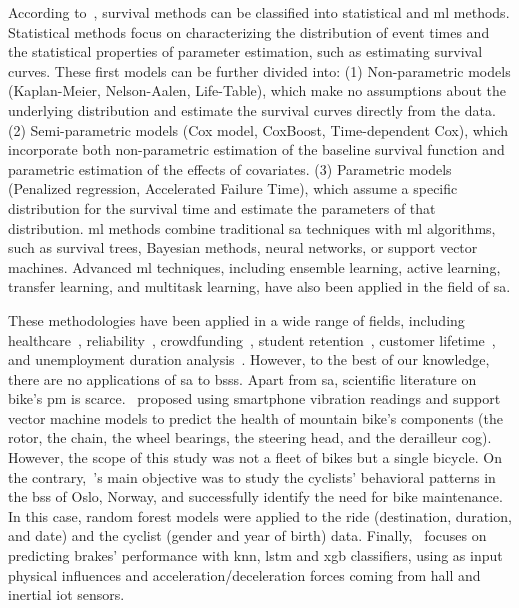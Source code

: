 According to~\cite{Wang2019_ml_review}, survival methods can be classified into statistical and \ac{ml} methods. Statistical methods focus on characterizing the distribution of event times and the statistical properties of parameter estimation, such as estimating survival curves. These first models can be further divided into: (1) Non-parametric models (Kaplan-Meier, Nelson-Aalen, Life-Table), which make no assumptions about the underlying distribution and estimate the survival curves directly from the data. (2) Semi-parametric models (Cox model, CoxBoost, Time-dependent Cox), which incorporate both non-parametric estimation of the baseline survival function and parametric estimation of the effects of covariates. (3) Parametric models (Penalized regression, Accelerated Failure Time), which assume a specific distribution for the survival time and estimate the parameters of that distribution. \ac{ml} methods combine traditional \ac{sa} techniques with \ac{ml} algorithms, such as survival trees, Bayesian methods, neural networks, or support vector machines. Advanced \ac{ml} techniques, including ensemble learning, active learning, transfer learning, and multitask learning, have also been applied in the field of \ac{sa}.

These methodologies have been applied in a wide range of fields, including healthcare~\cite{Reddy2015}, reliability~\cite{Modarres2016}, crowdfunding~\cite{Li2016}, student retention~\cite{Ameri2016}, customer lifetime~\cite{Furrer2022}, and unemployment duration analysis~\cite{Kiefer1988}. However, to the best of our knowledge, there are no applications of \ac{sa} to \acp{bss}. Apart from \ac{sa}, scientific literature on bike's \ac{pm} is scarce.~\cite{MountainBike2019} proposed using smartphone vibration readings and support vector machine models to predict the health of mountain bike's components (the rotor, the chain, the wheel bearings, the steering head, and the derailleur cog). However, the scope of this study was not a fleet of bikes but a single bicycle. On the contrary,~\cite{Predictivemaintenancebike2018}'s main objective was to study the cyclists' behavioral patterns in the \ac{bss} of Oslo, Norway, and successfully identify the need for bike maintenance. In this case, random forest models were applied to the ride (destination, duration, and date) and the cyclist (gender and year of birth) data. Finally,~\cite{Matkovic2021} focuses on predicting brakes' performance with \ac{knn}, \ac{lstm} and \ac{xgb} classifiers, using as input physical influences and acceleration/deceleration forces coming from hall and inertial \ac{iot} sensors.